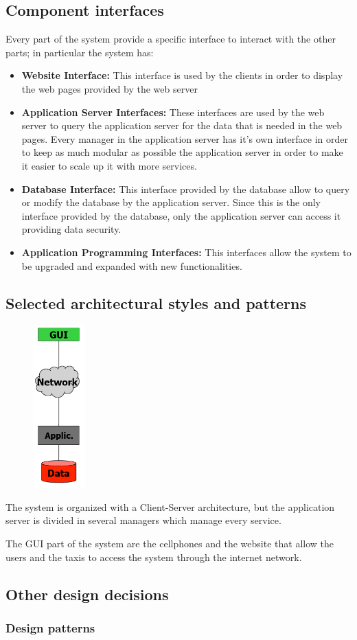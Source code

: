 \subsection{Component interfaces}
	Every part of the system provide a specific interface to interact with the other parts; in particular the system has:
	\begin{itemize}
		\item \textbf{Website Interface:} This interface is used by the clients in order to display the web pages provided by the web server
		\item \textbf{Application Server Interfaces:} These interfaces are used by the web server to query the application server for the data that is needed in the web pages. Every manager in the application server has it's own interface in order to keep as much modular as possible the application server in order to make it easier to scale up it with more services.
		\item \textbf{Database Interface:} This interface provided by the database allow to query or modify the database by the application server. Since this is the only interface provided by the database, only the application server can access it providing data security.
		\item \textbf{Application Programming Interfaces:} This interfaces allow the system to be upgraded and expanded with new functionalities.
	\end{itemize}
\subsection{Selected architectural styles and patterns}
	\begin{figure}
		\vspace{-30pt}
		\begin{center}	
			\includegraphics[width=0.18\textwidth]{./images/architecture.png}
		\end{center}
	\end{figure}
	The system is organized with a Client-Server architecture, but the application server is divided in several managers which manage every service. 
	
	The GUI part of the system are the cellphones and the website that allow the users and the taxis to access the system through the internet network. 
\newpage
\subsection{Other design decisions}
	\subsubsection{Design patterns}